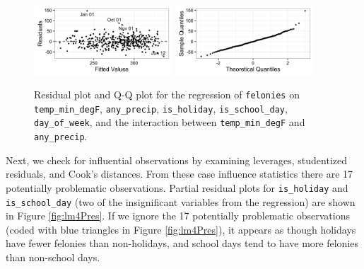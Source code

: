 \documentclass[11pt,notitlepage]{article}
\begin{document}
\begin{figure}[!h]
  \centering
  \captionsetup{width=0.9\textwidth}
  \subfloat%
  		{\includegraphics[width=0.46\textwidth]
  		{figures/lm4Residuals.png}\label{fig:lm4Residuals}}
  \hfill
  \subfloat%
  		{\includegraphics[width=0.46\textwidth]
  		{figures/lm4QQ.png}\label{fig:lm4QQ}}
  \vspace*{-3mm}
  \caption{Residual plot and Q-Q plot for the regression of \texttt{felonies} on \texttt{temp_min_degF}, \texttt{any_precip}, \texttt{is_holiday}, \texttt{is_school_day}, \texttt{day_of_week}, and the interaction between \texttt{temp_min_degF} and \texttt{any_precip}.}
  \label{fig:lm4ResidualsQQ}
  \vspace*{-3mm}
\end{figure}

Next, we check for influential observations by examining leverages, studentized residuals, and Cook's distances. From these case influence statistics there are 17 potentially problematic observations. Partial residual plots for \texttt{is_holiday} and \texttt{is_school_day} (two of the insignificant variables from the regression) are shown in Figure \ref{fig:lm4Pres}. If we ignore the 17 potentially problematic observations (coded with blue triangles in Figure \ref{fig:lm4Pres}), it appears as though holidays have fewer felonies than non-holidays, and school days tend to have more felonies than non-school days.
\end{document}
